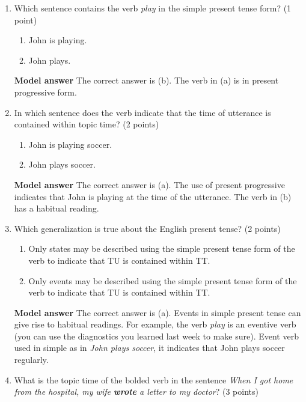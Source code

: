 \documentclass[a4,11pt]{article}
\newcommand{\6}{\mbox{$[\hspace*{-.6mm}[$}}
\newcommand{\9}{\mbox{$]\hspace*{-.6mm}]$}}
\begin{document}
\begin{enumerate}[leftmargin = 12pt]
{\bf Model answer} The correct answers as past tense (a), present tense (b) and future tense (c).


\item Which sentence contains the verb {\em play} in the simple present tense form? (1 point)

\begin{enumerate}[noitemsep]
\item John is playing.
\item John plays.
\end{enumerate}

{\bf Model answer} The correct answer is (b). The verb in (a) is in present progressive form.


\item In which sentence does the verb indicate that the time of utterance is contained within topic time? (2 points)
\begin{enumerate}[noitemsep]
\item John is playing soccer.
\item John plays soccer.
\end{enumerate}

{\bf Model answer} The correct answer is (a). The use of present progressive indicates that John is playing at the time of the utterance. The verb in (b) has a habitual reading.

\item Which generalization is true about the English present tense? (2 points)

\begin{enumerate}[noitemsep]
\item Only states may be described using the simple present tense form of the verb to indicate that TU is contained within TT.
\item Only events may be described using the simple present tense form of the verb to indicate that TU is contained within TT.\end{enumerate}

{\bf Model answer} The correct answer is (a). Events in simple present tense can give rise to habitual readings. For example, the verb \textit{play} is an eventive verb (you can use the diagnostics you learned last week to make sure). Event verb used in simple as in \textit{John plays soccer}, it indicates that John plays soccer regularly.


\item What is the topic time of the bolded verb in the sentence \textit{When I got home from the hospital, my wife {\bf wrote} a letter to my doctor}? (3 points)


\end{enumerate}
\end{document}
